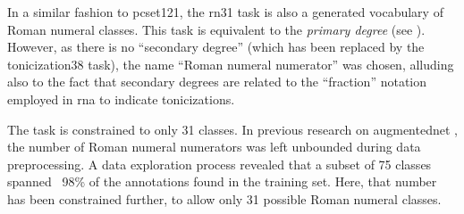 
In a similar fashion to \gls{pcset121}, the \gls{rn31} task
is also a generated vocabulary of Roman numeral classes.
This task is equivalent to the \emph{primary degree} (see
). However, as there is no
``secondary degree'' (which has been replaced by the
\gls{tonicization38} task), the name ``Roman numeral
numerator'' was chosen, alluding also to the fact that
secondary degrees are related to the ``fraction'' notation
employed in \gls{rna} to indicate tonicizations.

The task is constrained to only 31 classes. In previous
research on \gls{augmentednet}
\parencite{napoleslopez2021augmentednet}, the number of
Roman numeral numerators was left unbounded during data
preprocessing. A data exploration process revealed that a
subset of 75 classes spanned ~98\% of the annotations found
in the training set. Here, that number has been constrained
further, to allow only 31 possible Roman numeral classes.

